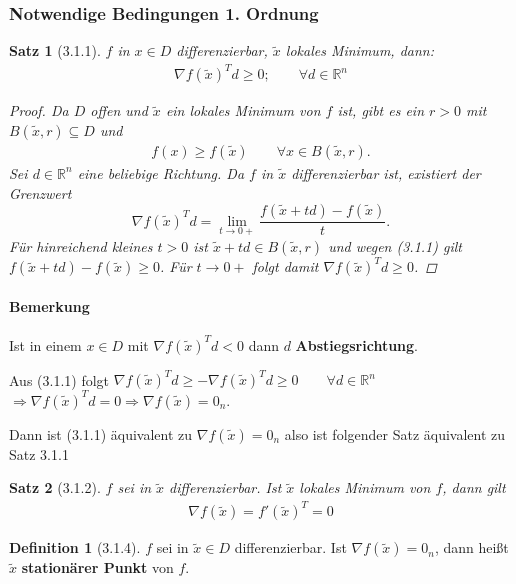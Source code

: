 \documentclass[ngerman,halfparskip]{scrartcl}
\newtheorem*{satz}{Satz}
\theoremstyle{definition}
\newtheorem*{defin}{Definition}
\def\R{\mathbb R}
\begin{document}
\subsubsection*{Notwendige Bedingungen 1. Ordnung}
\begin{satz}[3.1.1] $f$ in $x\in D$ differenzierbar, $\tilde x$ lokales Minimum, dann:\\
\begin{gather}\tag{3.1.1} \nabla f(\tilde x)^T d \geq 0; \qquad \forall d\in \R^n \end{gather}

\begin{proof}
Da $D$ offen und $\tilde x$ ein lokales Minimum von $f$ ist, gibt es ein $r>0$ mit $B(\tilde x,r)\subseteq D$ und \begin{gather*}
f(x)\geq f(\tilde x) \qquad \forall x\in B(\tilde x,r).
\end{gather*}
Sei $d\in\R^n$ eine beliebige Richtung. Da $f$ in $\tilde x$  differenzierbar ist, existiert der Grenzwert $$ \nabla f(\tilde x)^Td=\lim\limits_{t\to 0+}\frac{f(\tilde x + td) - f(\tilde x)}t.$$
Für hinreichend kleines $t>0$ ist $\tilde x+td\in B(\tilde x,r)$ und wegen (3.1.1) gilt $f(\tilde x +td)-f(\tilde x)\geq 0$. Für $t\to 0+$ folgt damit $\nabla f(\tilde x)^Td\geq 0$. 
\end{proof}
\end{satz}


\paragraph{Bemerkung} Ist in einem $x\in D$ mit $\nabla f(\tilde x)^T d < 0$ dann $d$ \textbf{Abstiegsrichtung}. 

Aus (3.1.1) folgt $\nabla f(\tilde x)^T d \geq -\nabla f(\tilde x)^T d \geq 0\qquad \forall d \in \R^n$\\
$\Rightarrow \nabla f(\tilde x)^T d =0 \Rightarrow \nabla f(\tilde x)=0_n$.

Dann ist (3.1.1) äquivalent zu $\nabla f(\tilde x)=0_n$ also ist folgender Satz äquivalent zu Satz 3.1.1
\begin{satz}[3.1.2] $f$ sei in $\tilde x$ differenzierbar. Ist $\tilde x$ lokales Minimum von $f$,  dann gilt
\begin{gather}\tag{3.1.2}\nabla f(\tilde x)=f'(\tilde x)^T=0\end{gather}
\end{satz}


\begin{defin}[3.1.4]  $f$ sei in $\tilde x \in D $ differenzierbar. Ist $\nabla f(\tilde x)=0_n$, dann heißt $\tilde x$ \textbf{stationärer Punkt} von $f$.
\end{defin}
\end{document}
